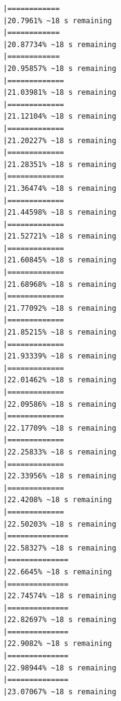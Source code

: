 \documentclass{article}\usepackage[]{graphicx}\usepackage[]{xcolor}
\makeatletter
\newenvironment{kframe}{%
 \def\at@end@of@kframe{}%
 \ifinner\ifhmode%
  \def\at@end@of@kframe{\end{minipage}}%
  \begin{minipage}{\columnwidth}%
 \fi\fi%
 \def\FrameCommand##1{\hskip\@totalleftmargin \hskip-\fboxsep
 \colorbox{shadecolor}{##1}\hskip-\fboxsep
     \hskip-\linewidth \hskip-\@totalleftmargin \hskip\columnwidth}%
 \MakeFramed {\advance\hsize-\width
   \@totalleftmargin\z@ \linewidth\hsize
   \@setminipage}}%
 {\par\unskip\endMakeFramed%
 \at@end@of@kframe}
\newenvironment{knitrout}{}{} %
\makeatother
\begin{document}
\begin{knitrout}
\begin{kframe}
\begin{verbatim}
|============                                                  |20.7961% ~18 s remaining  
|============                                                  |20.87734% ~18 s remaining 
|============                                                  |20.95857% ~18 s remaining 
|=============                                                 |21.03981% ~18 s remaining 
|=============                                                 |21.12104% ~18 s remaining 
|=============                                                 |21.20227% ~18 s remaining 
|=============                                                 |21.28351% ~18 s remaining 
|=============                                                 |21.36474% ~18 s remaining 
|=============                                                 |21.44598% ~18 s remaining 
|=============                                                 |21.52721% ~18 s remaining 
|=============                                                 |21.60845% ~18 s remaining 
|=============                                                 |21.68968% ~18 s remaining 
|=============                                                 |21.77092% ~18 s remaining 
|=============                                                 |21.85215% ~18 s remaining 
|=============                                                 |21.93339% ~18 s remaining 
|=============                                                 |22.01462% ~18 s remaining 
|=============                                                 |22.09586% ~18 s remaining 
|=============                                                 |22.17709% ~18 s remaining 
|=============                                                 |22.25833% ~18 s remaining 
|=============                                                 |22.33956% ~18 s remaining 
|=============                                                 |22.4208% ~18 s remaining  
|=============                                                 |22.50203% ~18 s remaining 
|==============                                                |22.58327% ~18 s remaining 
|==============                                                |22.6645% ~18 s remaining  
|==============                                                |22.74574% ~18 s remaining 
|==============                                                |22.82697% ~18 s remaining 
|==============                                                |22.9082% ~18 s remaining  
|==============                                                |22.98944% ~18 s remaining 
|==============                                                |23.07067% ~18 s remaining 

\end{verbatim}
\end{kframe}
\end{knitrout}
\end{document}
